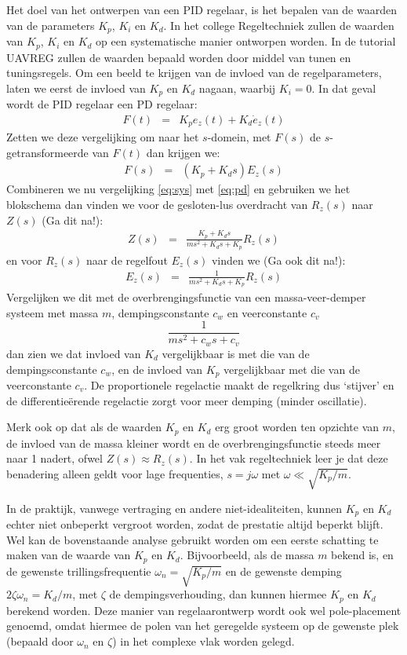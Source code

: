 \documentclass[a4paper,11pt]{article}
\begin{document}
Het doel van het ontwerpen van een PID regelaar, is het
bepalen van de waarden van de parameters $K_p$, $K_i$ en $K_d$. In het college
Regeltechniek zullen de waarden van $K_p$, $K_i$ en $K_d$ op een systematische
manier ontworpen worden. In de tutorial UAVREG zullen de waarden bepaald
worden door middel van tunen en tuningsregels. Om een beeld
te krijgen van de invloed van de regelparameters, laten we eerst de invloed
van $K_p$ en $K_d$ nagaan, waarbij $K_i=0$. In dat geval wordt de  PID
regelaar een PD regelaar:
\begin{eqnarray}
  F(t) & = & K_p e_z(t)  + K_d \dot{e}_z(t)
\end{eqnarray}
Zetten we deze vergelijking om naar het $s$-domein, met $F(s)$ de
$s$-getransformeerde van $F(t)$ dan krijgen we:
\begin{eqnarray}
  \label{eq:pd}
  F(s) & = & (K_p + K_d s ) E_z(s) 
\end{eqnarray}
Combineren we nu vergelijking \eqref{eq:sys} met \eqref{eq:pd} en gebruiken we
het blokschema \label{fig:blokschema_hoogte} dan vinden we
voor de gesloten-lus overdracht van $R_z(s)$ naar $Z(s)$ (Ga dit na!):
\begin{eqnarray}
  Z(s) & = & \frac{K_p + K_d s}{ms^2 + K_ds + K_p}  R_z(s)
\end{eqnarray}
en voor $R_z(s)$ naar de regelfout $E_z(s)$ vinden we (Ga ook dit na!):
\begin{eqnarray}
  E_z(s) & = & \frac{1}{ms^2 + K_ds + K_p}  R_z(s)
\end{eqnarray}
Vergelijken we dit met de overbrengingsfunctie van een massa-veer-demper
systeem met massa $m$, dempingsconstante $c_w$ en veerconstante $c_v$
\[
  \frac{1}{ms^2 + c_w s + c_v}
\]
dan zien we dat invloed van $K_d$ vergelijkbaar is met die van de
dempingsconstante $c_w$, en de invloed van $K_p$ vergelijkbaar met die van de
veerconstante $c_v$. De proportionele regelactie maakt de regelkring dus
`stijver' en de differentie\"erende regelactie zorgt voor meer demping (minder
oscillatie).

Merk ook op dat als de waarden $K_p$ en $K_d$ erg groot worden ten opzichte
van $m$, de invloed van de massa
kleiner wordt en de overbrengingsfunctie steeds meer naar 1 nadert, ofwel
$Z(s)\approx R_z(s)$. In het vak regeltechniek leer je dat deze benadering
alleen geldt voor lage frequenties, $s=j\omega$ met $\omega\ll \sqrt{K_p/m}$. 

In de praktijk, vanwege vertraging en andere niet-idealiteiten, kunnen $K_p$
en $K_d$ echter niet onbeperkt vergroot worden, zodat de prestatie altijd
beperkt blijft. Wel kan de bovenstaande analyse gebruikt worden om een eerste
schatting te maken van de waarde van $K_p$ en $K_d$. Bijvoorbeeld, als de
massa $m$ bekend is, en de gewenste trillingsfrequentie
$\omega_n=\sqrt{K_p/m}$ en de gewenste demping $2\zeta \omega_n = K_d/m$, met
$\zeta$ de dempingsverhouding, dan kunnen hiermee $K_p$ en $K_d$ berekend
worden. Deze manier van regelaarontwerp wordt ook wel pole-placement genoemd,
omdat hiermee de polen van het geregelde systeem op de gewenste plek (bepaald
door $\omega_n$ en $\zeta$) in het complexe vlak worden gelegd.
\end{document}
